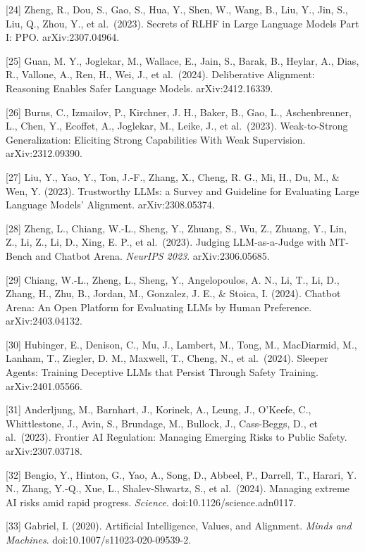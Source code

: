 {[}24{]} Zheng, R., Dou, S., Gao, S., Hua, Y., Shen, W., Wang, B., Liu, Y., Jin, S., Liu, Q., Zhou, Y., et al.~(2023). Secrets of RLHF in Large Language Models Part I: PPO. arXiv:2307.04964.

{[}25{]} Guan, M. Y., Joglekar, M., Wallace, E., Jain, S., Barak, B., Heylar, A., Dias, R., Vallone, A., Ren, H., Wei, J., et al.~(2024). Deliberative Alignment: Reasoning Enables Safer Language Models. arXiv:2412.16339.

{[}26{]} Burns, C., Izmailov, P., Kirchner, J. H., Baker, B., Gao, L., Aschenbrenner, L., Chen, Y., Ecoffet, A., Joglekar, M., Leike, J., et al.~(2023). Weak-to-Strong Generalization: Eliciting Strong Capabilities With Weak Supervision. arXiv:2312.09390.

{[}27{]} Liu, Y., Yao, Y., Ton, J.-F., Zhang, X., Cheng, R. G., Mi, H., Du, M., \& Wen, Y. (2023). Trustworthy LLMs: a Survey and Guideline for Evaluating Large Language Models' Alignment. arXiv:2308.05374.

{[}28{]} Zheng, L., Chiang, W.-L., Sheng, Y., Zhuang, S., Wu, Z., Zhuang, Y., Lin, Z., Li, Z., Li, D., Xing, E. P., et al.~(2023). Judging LLM-as-a-Judge with MT-Bench and Chatbot Arena. \emph{NeurIPS 2023}. arXiv:2306.05685.

{[}29{]} Chiang, W.-L., Zheng, L., Sheng, Y., Angelopoulos, A. N., Li, T., Li, D., Zhang, H., Zhu, B., Jordan, M., Gonzalez, J. E., \& Stoica, I. (2024). Chatbot Arena: An Open Platform for Evaluating LLMs by Human Preference. arXiv:2403.04132.

{[}30{]} Hubinger, E., Denison, C., Mu, J., Lambert, M., Tong, M., MacDiarmid, M., Lanham, T., Ziegler, D. M., Maxwell, T., Cheng, N., et al.~(2024). Sleeper Agents: Training Deceptive LLMs that Persist Through Safety Training. arXiv:2401.05566.

{[}31{]} Anderljung, M., Barnhart, J., Korinek, A., Leung, J., O'Keefe, C., Whittlestone, J., Avin, S., Brundage, M., Bullock, J., Cass-Beggs, D., et al.~(2023). Frontier AI Regulation: Managing Emerging Risks to Public Safety. arXiv:2307.03718.

{[}32{]} Bengio, Y., Hinton, G., Yao, A., Song, D., Abbeel, P., Darrell, T., Harari, Y. N., Zhang, Y.-Q., Xue, L., Shalev-Shwartz, S., et al.~(2024). Managing extreme AI risks amid rapid progress. \emph{Science}. doi:10.1126/science.adn0117.

{[}33{]} Gabriel, I. (2020). Artificial Intelligence, Values, and Alignment. \emph{Minds and Machines}. doi:10.1007/s11023-020-09539-2.

